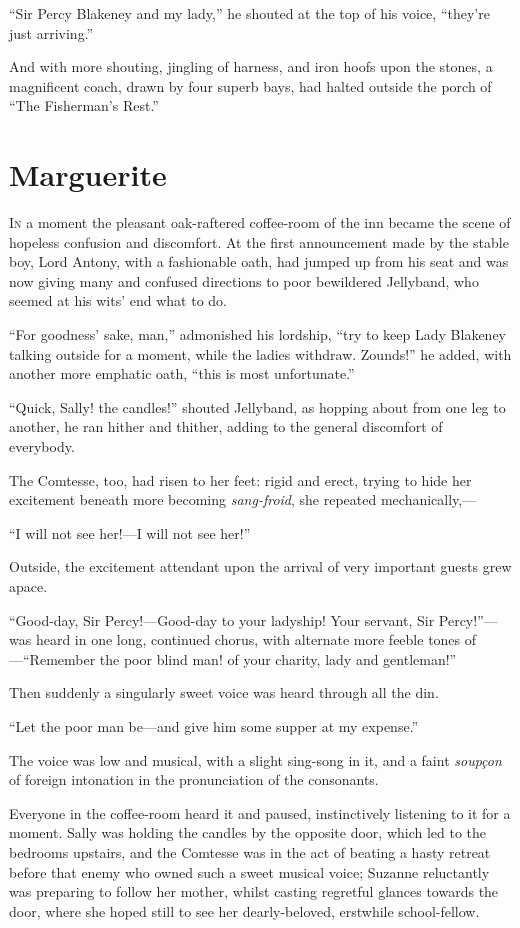 \documentclass[paper=a5,BCOR=7mm,twoside,DIV=calc,12pt,usegeometry,chapterprefix,endperiod,headings=big]{scrbook}
\begin{document}
\enquote{Sir Percy Blakeney and my lady,} he shouted at the top of his voice, \enquote{they're just arriving.}

And with more shouting, jingling of harness, and iron hoofs upon the stones, a magnificent coach, drawn by four superb bays, had halted outside the porch of \enquote{The Fisherman's Rest.}

\chapter{Marguerite}
\lettrine[lines=4]{I}{n} a moment the pleasant oak-raftered coffee-room of the inn became the scene of hopeless confusion and discomfort. At the first announcement made by the stable boy, Lord Antony, with a fashionable oath, had jumped up from his seat and was now giving many and confused directions to poor bewildered Jellyband, who seemed at his wits’ end what to do.

\enquote{For goodness’ sake, man,} admonished his lordship, \enquote{try to keep Lady Blakeney talking outside for a moment, while the ladies withdraw. Zounds!} he added, with another more emphatic oath, \enquote{this is most unfortunate.}

\enquote{Quick, Sally! the candles!} shouted Jellyband, as hopping about from one leg to another, he ran hither and thither, adding to the general discomfort of everybody.

The Comtesse, too, had risen to her feet: rigid and erect, trying to hide her excitement beneath more becoming \textit{sang-froid}, she repeated mechanically,---

\enquote{I will not see her!---I will not see her!}

Outside, the excitement attendant upon the arrival of very important guests grew apace.

\enquote{Good-day, Sir Percy!---Good-day to your ladyship! Your servant, Sir Percy!}---was heard in one long, continued chorus, with alternate more feeble tones of---\enquote{Remember the poor blind man! of your charity, lady and gentleman!}

Then suddenly a singularly sweet voice was heard through all the din.

\enquote{Let the poor man be---and give him some supper at my expense.}

The voice was low and musical, with a slight sing-song in it, and a faint \textit{soupçon} of foreign intonation in the pronunciation of the consonants.

Everyone in the coffee-room heard it and paused, instinctively listening to it for a moment. Sally was holding the candles by the opposite door, which led to the bedrooms upstairs, and the Comtesse was in the act of beating a hasty retreat before that enemy who owned such a sweet musical voice; Suzanne reluctantly was preparing to follow her mother, whilst casting regretful glances towards the door, where she hoped still to see her dearly-beloved, erstwhile school-fellow.
\end{document}
